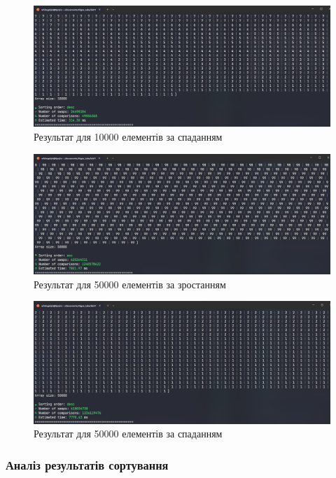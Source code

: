 \begin{figure}[h!]
  \centering
  \includegraphics[width=13cm]{reports/algos/lab11/assets/10000d.png}
  \caption{Результат для 10000 елементів за спаданням}
\end{figure}

\begin{figure}[h!]
  \centering
  \includegraphics[width=13cm]{reports/algos/lab11/assets/50000a.png}
  \caption{Результат для 50000 елементів за зростанням}
\end{figure}

\begin{figure}[h!]
  \centering
  \includegraphics[width=13cm]{reports/algos/lab11/assets/50000d.png}
  \caption{Результат для 50000 елементів за спаданням}
\end{figure}



\clearpage
\subsubsection{Аналіз результатів сортування}

